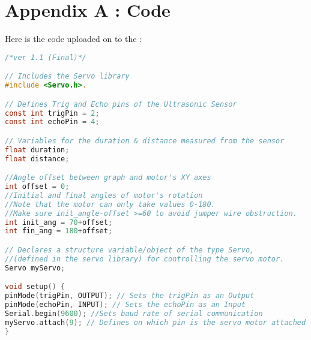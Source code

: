 \chapter{Appendix A : \arduino{} Code}\label{ch:appAlabel}
Here is the code uploaded on to the \arduinouno{}:
\begin{mdframed}[backgroundcolor=light-gray, roundcorner=10pt,leftmargin=1, rightmargin=1, innerleftmargin=15, innertopmargin=15,innerbottommargin=15, outerlinewidth=1, linecolor=light-gray]
\begin{lstlisting}[caption={The Arduino Code},language = C]
/*ver 1.1 (Final)*/

// Includes the Servo library
#include <Servo.h>. 

// Defines Trig and Echo pins of the Ultrasonic Sensor
const int trigPin = 2;
const int echoPin = 4;

// Variables for the duration & distance measured from the sensor
float duration;
float distance;

//Angle offset between graph and motor's XY axes
int offset = 0;
//Initial and final angles of motor's rotation
//Note that the motor can only take values 0-180.
//Make sure init_angle-offset >=60 to avoid jumper wire obstruction.
int init_ang = 70+offset;
int fin_ang = 180+offset;

// Declares a structure variable/object of the type Servo,
//(defined in the servo library) for controlling the servo motor.
Servo myServo; 

void setup() {
pinMode(trigPin, OUTPUT); // Sets the trigPin as an Output
pinMode(echoPin, INPUT); // Sets the echoPin as an Input
Serial.begin(9600); //Sets baud rate of serial communication
myServo.attach(9); // Defines on which pin is the servo motor attached
}


\end{lstlisting}
\end{mdframed}
